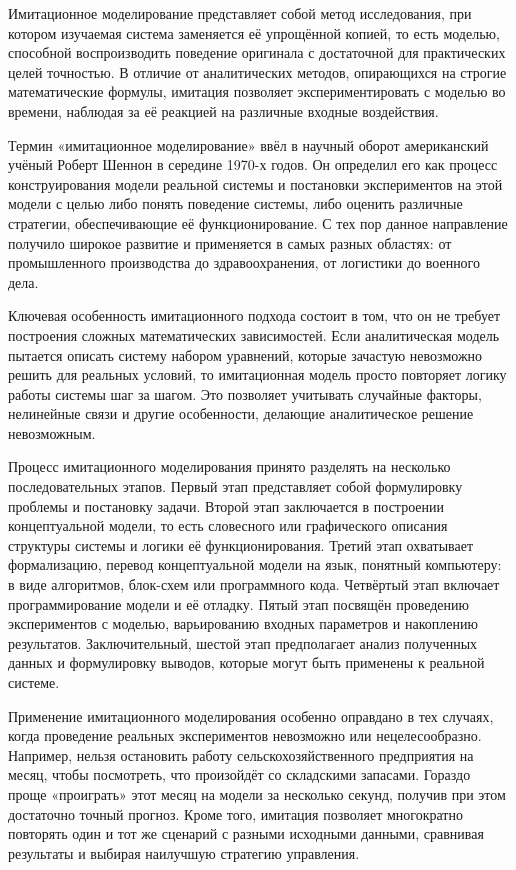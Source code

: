 \documentclass[14pt,a4paper]{extreport}
\begin{document}
\begin{singlespacing}
	Имитационное моделирование представляет собой метод исследования, при котором изучаемая система заменяется её упрощённой копией, то есть моделью, способной воспроизводить поведение оригинала с достаточной для практических целей точностью. В отличие от аналитических методов, опирающихся на строгие математические формулы, имитация позволяет экспериментировать с моделью во времени, наблюдая за её реакцией на различные входные воздействия.
	
	Термин «имитационное моделирование» ввёл в научный оборот американский учёный Роберт Шеннон в середине 1970-х годов. Он определил его как процесс конструирования модели реальной системы и постановки экспериментов на этой модели с целью либо понять поведение системы, либо оценить различные стратегии, обеспечивающие её функционирование. С тех пор данное направление получило широкое развитие и применяется в самых разных областях: от промышленного производства до здравоохранения, от логистики до военного дела.
	
	Ключевая особенность имитационного подхода состоит в том, что он не требует построения сложных математических зависимостей. Если аналитическая модель пытается описать систему набором уравнений, которые зачастую невозможно решить для реальных условий, то имитационная модель просто повторяет логику работы системы шаг за шагом. Это позволяет учитывать случайные факторы, нелинейные связи и другие особенности, делающие аналитическое решение невозможным.
	
	Процесс имитационного моделирования принято разделять на несколько последовательных этапов. Первый этап представляет собой формулировку проблемы и постановку задачи. Второй этап заключается в построении концептуальной модели, то есть словесного или графического описания структуры системы и логики её функционирования. Третий этап охватывает формализацию, перевод концептуальной модели на язык, понятный компьютеру: в виде алгоритмов, блок-схем или программного кода. Четвёртый этап включает программирование модели и её отладку. Пятый этап посвящён проведению экспериментов с моделью, варьированию входных параметров и накоплению результатов. Заключительный, шестой этап предполагает анализ полученных данных и формулировку выводов, которые могут быть применены к реальной системе.
	
	Применение имитационного моделирования особенно оправдано в тех случаях, когда проведение реальных экспериментов невозможно или нецелесообразно. Например, нельзя остановить работу сельскохозяйственного предприятия на месяц, чтобы посмотреть, что произойдёт со складскими запасами. Гораздо проще «проиграть» этот месяц на модели за несколько секунд, получив при этом достаточно точный прогноз. Кроме того, имитация позволяет многократно повторять один и тот же сценарий с разными исходными данными, сравнивая результаты и выбирая наилучшую стратегию управления.
	

\end{singlespacing}
\end{document}
